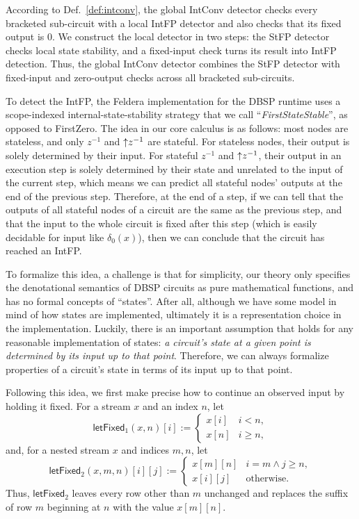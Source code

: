 According to Def.~\ref{def:intconv}, the global IntConv detector checks every bracketed sub-circuit with a local IntFP detector and also checks that its fixed output is $0$. We construct the local detector in two steps: the StFP detector checks local state stability, and a fixed-input check turns its result into IntFP detection. Thus, the global IntConv detector combines the StFP detector with fixed-input and zero-output checks across all bracketed sub-circuits.

To detect the IntFP, the Feldera implementation for the DBSP runtime uses a scope-indexed internal-state-stability strategy that we call ``\emph{FirstStateStable}'', as opposed to FirstZero. The idea in our core calculus is as follows: most nodes are stateless, and only $z^{-1}$ and ${\uparrow}z^{-1}$ are stateful. For stateless nodes, their output is solely determined by their input. For stateful $z^{-1}$ and ${\uparrow}z^{-1}$, their output in an execution step is solely determined by their state and unrelated to the input of the current step, which means we can predict all stateful nodes' outputs at the end of the previous step. Therefore, at the end of a step, if we can tell that the outputs of all stateful nodes of a circuit are the same as the previous step, and that the input to the whole circuit is fixed after this step
(which is easily decidable for input like $\delta_0(x)$), then we can conclude that the circuit has reached an IntFP.

To formalize this idea, a challenge is that for simplicity, our theory only specifies the denotational semantics of DBSP circuits as pure mathematical functions, and has no formal concepts of ``states''. After all, although we have some model in mind of how states are implemented, ultimately it is a representation choice in the implementation.
Luckily, there is an important assumption that holds for any reasonable implementation of states: \emph{a circuit's state at a given point is determined by its input up to that point}. Therefore, we can always formalize properties of a circuit's state in terms of its input up to that point.

Following this idea, we first make precise how to continue an observed input by holding it fixed. For a stream $x$ and an index $n$, let
\[
\mathsf{letFixed}_1(x,n)[i] :=
\begin{cases}
    x[i] & i < n,\\
    x[n] & i \geq n,
\end{cases}
\]
and, for a nested stream $x$ and indices $m,n$, let
\[
\mathsf{letFixed}_2(x,m,n)[i][j] :=
\begin{cases}
    x[m][n] & i=m \land j \geq n,\\
    x[i][j] & \text{otherwise}.
\end{cases}
\]
Thus, $\mathsf{letFixed}_2$ leaves every row other than $m$ unchanged and replaces the suffix of row $m$ beginning at $n$ with the value $x[m][n]$.

